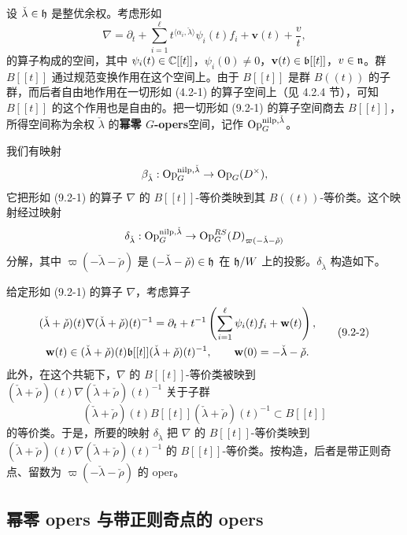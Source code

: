 设 $\check\lambda\in\mathfrak{h}$ 是整优余权。考虑形如
\begin{equation}
\nabla = \partial_t + \sum_{i=1}^{\ell}t^{\langle\alpha_i,\check\lambda\rangle}\psi_i(t)f_i + \mathbf{v}(t) + \frac{v}{t},
\tag{9.2-1}
\end{equation}
的算子构成的空间，其中 $\psi_i(t)\in\mathbb{C}[[t]]$，$\psi_i(0)\ne 0$，$\mathbf{v}(t)\in\mathfrak{b}[[t]]$，$v\in\mathfrak{n}$。群 $B[[t]]$ 通过规范变换作用在这个空间上。由于 $B[[t]]$ 是群 $B((t))$ 的子群，而后者自由地作用在一切形如 (4.2-1) 的算子空间上（见 4.2.4 节），可知 $B[[t]]$ 的这个作用也是自由的。把一切形如 (9.2-1) 的算子空间商去 $B[[t]]$，所得空间称为余权 $\check\lambda$ 的\textbf{幂零 $G$-opers}空间，记作 $\operatorname{Op}^{\mathrm{nilp},\check\lambda}_G$。

我们有映射
\[
\beta_{\check\lambda}: \operatorname{Op}^{\mathrm{nilp},\check\lambda}_G\to\operatorname{Op}_G(D^\times),
\]
它把形如 (9.2-1) 的算子 $\nabla$ 的 $B[[t]]$-等价类映到其 $B((t))$-等价类。这个映射经过映射
\[
\delta_{\check\lambda}: \operatorname{Op}^{\mathrm{nilp},\check\lambda}_G\to\operatorname{Op}^{RS}_G(D)_{\varpi(-\check\lambda-\check\rho)}
\]
分解，其中 $\varpi(-\check\lambda-\check\rho)$ 是 $(-\check\lambda-\check\rho)\in\mathfrak{h}$ 在 $\mathfrak{h}/W$ 上的投影。$\delta_{\check\lambda}$ 构造如下。

给定形如 (9.2-1) 的算子 $\nabla$，考虑算子
\begin{equation}
\begin{gathered}
(\check\lambda+\check\rho)(t)\nabla(\check\lambda+\check\rho)(t)^{-1}
= \partial_t + t^{-1}\left(\sum_{i=1}^{\ell}\psi_i(t)f_i + \mathbf{w}(t)\right),\\
\mathbf{w}(t)\in(\check\lambda+\check\rho)(t)\mathfrak{b}[[t]](\check\lambda+\check\rho)(t)^{-1},\qquad \mathbf{w}(0) = -\check\lambda-\check\rho.
\end{gathered}
\tag{9.2-2}
\end{equation}
此外，在这个共轭下，$\nabla$ 的 $B[[t]]$-等价类被映到 $(\check\lambda+\check\rho)(t)\nabla(\check\lambda+\check\rho)(t)^{-1}$ 关于子群
\[
(\check\lambda+\check\rho)(t)B[[t]](\check\lambda+\check\rho)(t)^{-1}\subset B[[t]]
\]
的等价类。于是，所要的映射 $\delta_{\check\lambda}$ 把 $\nabla$ 的 $B[[t]]$-等价类映到 $(\check\lambda+\check\rho)(t)\nabla(\check\lambda+\check\rho)(t)^{-1}$ 的 $B[[t]]$-等价类。按构造，后者是带正则奇点、留数为 $\varpi(-\check\lambda-\check\rho)$ 的 oper。

\subsection{幂零 opers 与带正则奇点的 opers}


